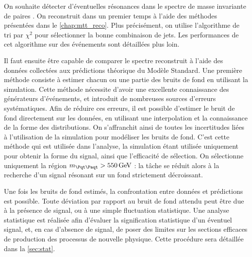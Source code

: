 On souhaite détecter d'éventuelles résonances dans le spectre de masse invariante de paires \ttbar. On reconstruit dans un premier temps \mtt à l'aide des méthodes présentées dans le \cref{chap:mtt_reco}. Plus précisément, on utilise l'algorithme de tri par $\chi^2$ pour sélectionner la bonne combinaison de jets. Les performances de cet algorithme sur des événements \zprime sont détaillées plus loin.

\smallskip

Il faut ensuite être capable de comparer le spectre \mtt reconstruit à l'aide des données collectées aux prédictions théorique du Modèle Standard. Une première méthode consiste à estimer chacun ou une partie des bruits de fond en utilisant la simulation. Cette méthode nécessite d'avoir une excellente connaissance des générateurs d'événements, et introduit de nombreuses sources d'erreurs systématiques. Afin de réduire ces erreurs, il est possible d'estimer le bruit de fond directement sur les données, en utilisant une interpolation et la connaissance de la forme des distributions. On s'affranchit ainsi de toutes les incertitudes liées à l'utilisation de la simulation pour modéliser les bruits de fond. C'est cette méthode qui est utilisée dans l'analyse, la simulation étant utilisée uniquement pour obtenir la forme du signal, ainsi que l'efficacité de sélection. On sélectionne uniquement la région $\mtt > \SI{550}{\GeV}$ : la tâche se réduit alors à la recherche d'un signal résonant sur un fond strictement décroissant.

\smallskip

Une fois les bruits de fond estimés, la confrontation entre données et prédictions est possible. Toute déviation par rapport au bruit de fond attendu peut être due à la présence de signal, ou à une simple fluctuation statistique. Une analyse statistique est réalisée afin d'évaluer la signification statistique d'un éventuel signal, et, en cas d'absence de signal, de poser des limites sur les sections efficaces de production des processus de nouvelle physique. Cette procédure sera détaillée dans la \cref{sec:stat}.


